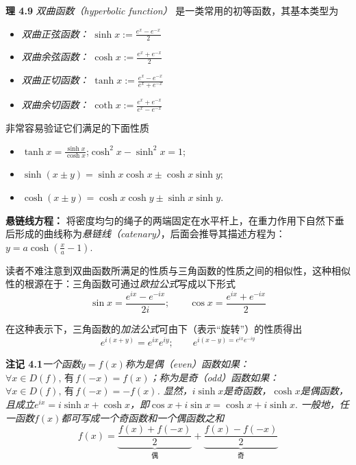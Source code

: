 \documentclass{article}
\begin{document}
\textbf{理 4.9} \textit{双曲函数（hyperbolic function）} 是一类常用的初等函数，其基本类型为

\begin{itemize}
    \item \textit{双曲正弦函数：} $\displaystyle \sinh{x}:=\frac{e^{x}-e^{-x}}{2}$
    \item \textit{双曲余弦函数：} $\displaystyle \cosh{x}:=\frac{e^{x}+e^{-x}}{2}$
    \item \textit{双曲正切函数：} $\displaystyle \tanh{x}:=\frac{e^{x}-e^{-x}}{e^{x}+e^{-x}}$
    \item \textit{双曲余切函数：} $\displaystyle \coth{x}:=\frac{e^{x}+e^{-x}}{e^{x}-e^{-x}}$
\end{itemize}

非常容易验证它们满足的下面性质
\begin{itemize}
    \item $\displaystyle\tanh{x}=\frac{\sinh{x}}{\cosh{x}}$;\quad $\cosh^{2}{x}-\sinh^{2}{x}=1$;
    \item $\displaystyle\sinh{(x\pm y)}=\sinh{x}\cosh{x}\pm \cosh{x}\sinh{y};$
    \item$\displaystyle\cosh{(x\pm y)}=\cosh{x}\cosh{y}\pm \sinh{x}\sinh{y}$.
\end{itemize}

\textbf{悬链线方程：} 将密度均匀的绳子的两端固定在水平杆上，在重力作用下自然下垂后形成的曲线称为\textit{悬链线（catenary）}，后面会推导其描述方程为：$y=a\cosh{\left(\frac{x}{a}-1\right)}$.

\vspace{4pt}

读者不难注意到双曲函数所满足的性质与三角函数的性质之间的相似性，这种相似性的根源在于：三角函数可通过\textit{欧拉公式}写成以下形式\[\sin{x}=\frac{e^{ix}-e^{-ix}}{2i};\qquad \cos{x}=\frac{e^{ix}+e^{-ix}}{2}\]

在这种表示下，三角函数的\textit{加法公式}可由下（表示“旋转”）的性质得出\[e^{i(x+y)}=e^{ix}e^{iy};\qquad e^{i(x-y)=e^{ix}e^{-iy}}\]

\textbf{注记 4.1}\textit{一个函数$y=f(x)$称为是偶（even）函数如果：$\forall x\in D(f),\,\text{有}\,f(-x)=f(x)$；称为是奇（odd）函数如果：$\forall x\in D(f),\,\text{有}\,f(-x)=-f(x)$. 显然，$i\sinh{x}$是奇函数，$\cosh{x}$是偶函数，且成立$e^{ix}=i\sinh{x}+\cosh{x}$，即}$\cos{x}+i\sin{x}=\cosh{x}+i\sinh{x}$. \textit{一般地，任一函数$f(x)$都可写成一个奇函数和一个偶函数之和}\[f(x)=\underbrace{\frac{f(x)+f(-x)}{2}}_{\textit{偶}}+\underbrace{\frac{f(x)-f(-x)}{2}}_{\textit{奇}}\]
\end{document}
